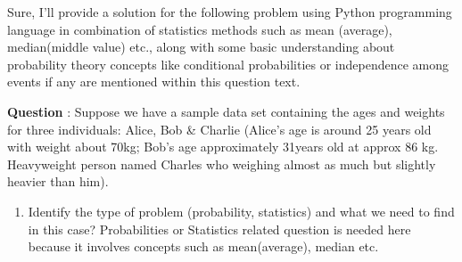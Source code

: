 Sure, I'll provide a solution for the following problem using Python programming language in combination of statistics methods such as mean (average), median(middle value) etc., along with some basic understanding about probability theory concepts like conditional probabilities or independence among events if any are mentioned within this question text. 

\textbf{Question} : Suppose we have a sample data set containing the ages and weights for three individuals: Alice, Bob & Charlie (Alice's age is around 25 years old with weight about 70kg; Bob’s age approximately 31years old at approx 86 kg. Heavyweight person named Charles who weighing almost as much but slightly heavier than him).
\begin{enumerate}
    \item Identify the type of problem (probability, statistics) and what we need to find in this case? Probabilities or Statistics related question is needed here because it involves concepts such as mean(average), median etc. 
    

\end{enumerate}
